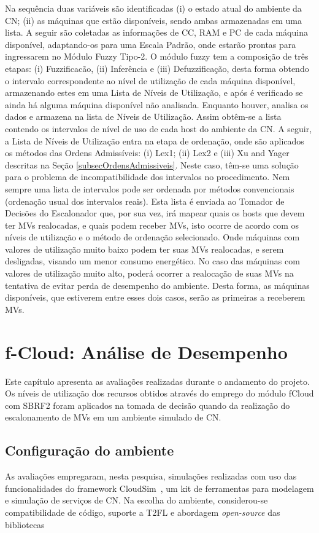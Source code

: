 \documentclass[tcc,capa]{texufpel}
\begin{document}
Na sequência duas variáveis são identificadas (i) o estado atual do ambiente da CN; (ii) as máquinas que estão disponíveis, sendo ambas armazenadas em uma lista. A seguir são coletadas as informações de CC, RAM e PC de cada máquina disponível, adaptando-os para uma Escala Padrão, onde estarão prontas para ingressarem no Módulo Fuzzy Tipo-2. O módulo fuzzy tem a composição de três etapas: (i) Fuzzificacão, (ii) Inferência e (iii) Defuzzificação,  desta forma obtendo o intervalo correspondente ao nível de utilização de cada máquina disponível, armazenando estes em uma Lista de Níveis de Utilização, e após é verificado se ainda há alguma máquina disponível não analisada. Enquanto houver, analisa os dados e armazena na lista de Níveis de Utilização. Assim obtêm-se a lista contendo os intervalos de nível de uso de cada host do ambiente da CN.
A seguir, a Lista de Níveis de Utilização entra na etapa de ordenação, onde são aplicados os métodos das Ordens Admissíveis: (i) Lex1; (ii) Lex2 e (iii) Xu and Yager descritas na Seção \ref{subsecOrdensAdmissiveis}. Neste caso, têm-se uma solução para o problema de incompatibilidade dos intervalos no procedimento. Nem sempre uma lista de intervalos pode ser ordenada por métodos convencionais (ordenação usual dos intervalos reais).
Esta lista é enviada ao Tomador de Decisões do Escalonador que, por sua vez, irá mapear quais os hosts que devem ter MVs realocadas, e quais podem receber MVs, isto ocorre de acordo com os níveis de utilização e o método de ordenação selecionado. Onde máquinas com valores de utilização muito baixo podem ter suas MVs realocadas, e serem desligadas, visando um menor consumo energético. 
No caso das máquinas com valores de utilização muito alto, poderá ocorrer a realocação de suas MVs na tentativa de evitar perda de desempenho do ambiente. Desta forma, as máquinas disponíveis, que estiverem entre esses dois casos, serão as primeiras a receberem MVs.

\chapter{f-Cloud: Análise de Desempenho} \label{capAnaliseDeDesempenho}

Este capítulo apresenta as avaliações realizadas durante o andamento do projeto. Os níveis de utilização dos recursos obtidos através do emprego do módulo fCloud com SBRF2 foram aplicados na tomada de decisão quando da realização do escalonamento de MVs em um ambiente simulado de CN.

\section{Configuração do ambiente}
As avaliações empregaram, nesta pesquisa, simulações realizadas com uso das funcionalidades do framework CloudSim~\cite{calheiros2011cloudsim}, um kit de ferramentas para modelagem e simulação de serviços de CN. Na escolha do ambiente, considerou-se compatibilidade de código, suporte a T2FL e abordagem \emph{open-source} das bibliotecas
\end{document}
